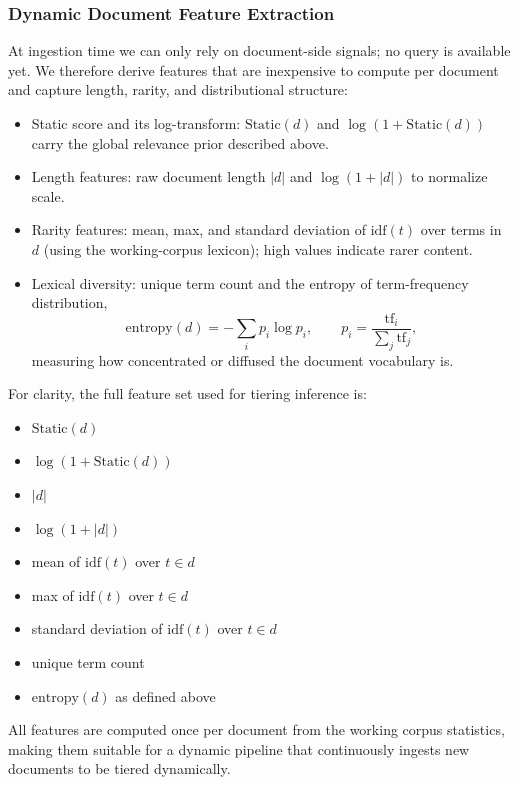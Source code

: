 \documentclass[11pt]{article}
\begin{document}
\subsubsection{Dynamic Document Feature Extraction}
At ingestion time we can only rely on document-side signals; no query is available yet. We therefore derive features that are inexpensive to compute per document and capture length, rarity, and distributional structure:
\begin{itemize}
  \item Static score and its log-transform: $\text{Static}(d)$ and $\log(1 + \text{Static}(d))$ carry the global relevance prior described above.
  \item Length features: raw document length $|d|$ and $\log(1 + |d|)$ to normalize scale.
  \item Rarity features: mean, max, and standard deviation of $\text{idf}(t)$ over terms in $d$ (using the working-corpus lexicon); high values indicate rarer content.
  \item Lexical diversity: unique term count and the entropy of term-frequency distribution,
  \[
  \text{entropy}(d) = - \sum_i p_i \log p_i, \qquad p_i = \frac{\text{tf}_i}{\sum_j \text{tf}_j},
  \]
  measuring how concentrated or diffused the document vocabulary is.
\end{itemize}
For clarity, the full feature set used for tiering inference is:
\begin{itemize}
  \item $\text{Static}(d)$
  \item $\log(1 + \text{Static}(d))$
  \item $|d|$
  \item $\log(1 + |d|)$
  \item mean of $\text{idf}(t)$ over $t \in d$
  \item max of $\text{idf}(t)$ over $t \in d$
  \item standard deviation of $\text{idf}(t)$ over $t \in d$
  \item unique term count
  \item $\text{entropy}(d)$ as defined above
\end{itemize}
All features are computed once per document from the working corpus statistics, making them suitable for a dynamic pipeline that continuously ingests new documents to be tiered dynamically.
\end{document}
